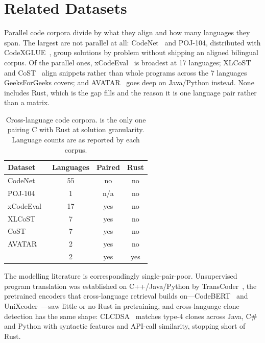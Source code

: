\section{Related Datasets}
\label{sec:related}

Parallel code corpora divide by what they align and how many languages they
span. The largest are not parallel at all:
CodeNet~\cite{puri2021codenet} and POJ-104, distributed with
CodeXGLUE~\cite{lu2021codexglue}, group solutions by problem without
shipping an aligned bilingual corpus. Of the parallel ones,
xCodeEval~\cite{khan2024xcodeeval} is broadest at 17 languages;
XLCoST~\cite{zhu2022xlcost} and CoST~\cite{zhu2022cost} align snippets
rather than whole programs across the 7 languages GeeksForGeeks covers; and
AVATAR~\cite{ahmad2023avatar} goes deep on Java/Python instead. None includes
Rust, which is the gap \dsname{} fills and the reason it is one language pair
rather than a matrix.

\ifextended
\begin{table}[tbp]
\caption{Cross-language code corpora. \dsname{} is the only one pairing C with
Rust at solution granularity. Language counts are as reported by each corpus.}
\label{tab:related}
\centering
\begin{tabular}{lccc}
\toprule
Dataset & Languages & Paired & Rust \\
\midrule
CodeNet~\cite{puri2021codenet}         & 55  & no  & no \\
POJ-104~\cite{lu2021codexglue}         & 1   & n/a & no \\
xCodeEval~\cite{khan2024xcodeeval}     & 17  & yes & no \\
XLCoST~\cite{zhu2022xlcost}            & 7   & yes & no \\
CoST~\cite{zhu2022cost}                & 7   & yes & no \\
AVATAR~\cite{ahmad2023avatar}          & 2   & yes & no \\
\midrule
\dsname{}                              & 2   & yes & yes \\
\bottomrule
\end{tabular}
\end{table}
\fi

The modelling literature is correspondingly single-pair-poor. Unsupervised
program translation was established on C++/Java/Python by
TransCoder~\cite{roziere2020transcoder}, the pretrained encoders that
cross-language retrieval builds on---CodeBERT~\cite{feng2020codebert} and
UniXcoder~\cite{guo2022unixcoder}---saw little or no Rust in pretraining, and
cross-language clone detection has the same shape:
CLCDSA~\cite{nafi2019clcdsa} matches type-4 clones across Java, C\# and Python
with syntactic features and API-call similarity, stopping short of Rust.

